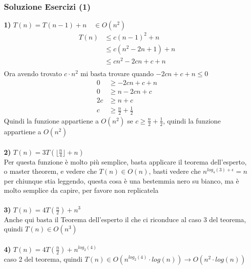 \documentclass[a4paper,12pt]{article}
\begin{document}
\subsubsection*{Soluzione Esercizi (1)}
\textbf{1)} $T(n) = T(n-1) + n \quad \in O(n^2)$ \\
\begin{align*}
    T(n)  &\le c(n-1)^{2} + n \\
            &\le  c(n^{2} - 2n + 1) + n \\
            &\le cn^{2} - 2cn + c + n \\
\end{align*}
Ora avendo trovato $c \cdot n^2$ mi basta trovare quando $-2cn + c + n \leq 0$ \\
\begin{align*}
    0 &\ge -2cn + c + n \\
    0 &\ge n - 2cn + c \\
    2c &\ge n + c \\
    c &\ge \frac{n}{2} + \frac{1}{2}
\end{align*}
Quindi la funzione appartiene a $O(n^2)$ se $c \ge \frac{n}{2} + \frac{1}{2}$, quindi la funzione appartiene a $O(n^2)$\\
\\
\textbf{2)} $T(n) = 3T(\lfloor \frac{n}{4} \rfloor + n)$ \\
Per questa funzione è molto più semplice, basta applicare il teorema dell'esperto, o master theorem, e vedere che $T(n) \in O(n)$, basti vedere che $n^{log_{4}(3) + \epsilon} = n$ {\tiny{per chiunque stia leggendo, questa cosa è una bestemmia nero su bianco, ma è molto semplice da capire, per favore non replicatela}} \\ \\
\textbf{3)} $T(n) = 4T(\frac{n}{2}) + n^{3}$ \\
Anche qui basta il Teorema dell'esperto il che ci riconduce al caso 3 del teorema, quindi $T(n) \in O(n^{3})$ \\  \\
\textbf{4)} $T(n) = 4T(\frac{n}{2}) + n^{log_{2}(4)}$ \\
caso 2 del teorema, quindi $T(n) \in O(n^{log_{2}(4)} \cdot log(n)) \rightarrow O(n^{2} \cdot log(n))$  \\
\end{document}
